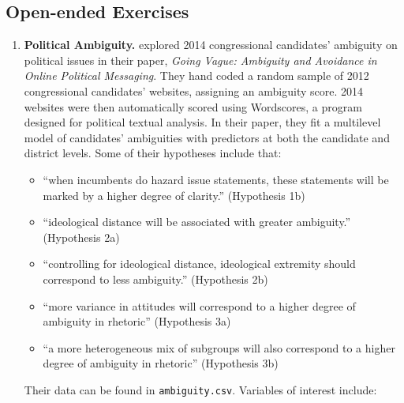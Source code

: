 \documentclass[
]{krantz}
\providecommand{\tightlist}{%
  \setlength{\itemsep}{0pt}\setlength{\parskip}{0pt}}
\begin{document}
\hypertarget{open-ended-exercises-3}{%
\subsection{Open-ended Exercises}\label{open-ended-exercises-3}}

\begin{enumerate}
\def\labelenumi{\arabic{enumi}.}
\item
  \textbf{Political Ambiguity.} \citet{Chapp2018} explored 2014 congressional candidates' ambiguity on political issues in their paper, \emph{Going Vague: Ambiguity and Avoidance in Online Political Messaging}. They hand coded a random sample of 2012 congressional candidates' websites, assigning an ambiguity score. 2014 websites were then automatically scored using Wordscores, a program designed for political textual analysis. In their paper, they fit a multilevel model of candidates' ambiguities with predictors at both the candidate and district levels. Some of their hypotheses include that:

  \begin{itemize}
  \tightlist
  \item
    ``when incumbents do hazard issue statements, these statements will be marked by a higher degree of clarity.'' (Hypothesis 1b)\\
  \item
    ``ideological distance will be associated with greater ambiguity.'' (Hypothesis 2a)\\
  \item
    ``controlling for ideological distance, ideological extremity should correspond to less ambiguity.'' (Hypothesis 2b)
  \item
    ``more variance in attitudes will correspond to a higher degree of ambiguity in rhetoric'' (Hypothesis 3a)
  \item
    ``a more heterogeneous mix of subgroups will also correspond to a higher degree of ambiguity in rhetoric'' (Hypothesis 3b)
  \end{itemize}

  Their data can be found in \texttt{ambiguity.csv}. Variables of interest include:


\end{enumerate}
\end{document}
